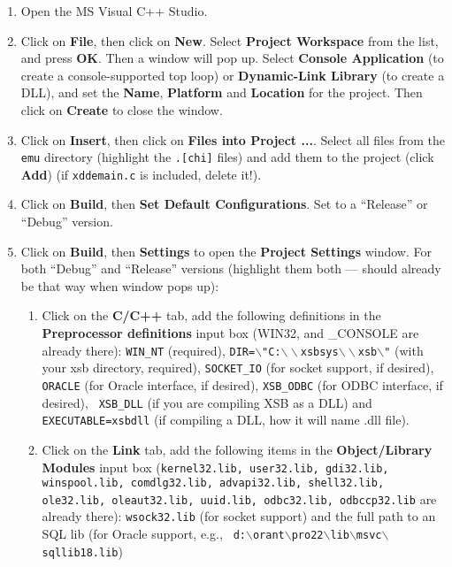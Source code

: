 \begin{enumerate}

\item
   Open the MS Visual C++ Studio.

\item
   Click on {\bf File}, then click on {\bf New}.  Select {\bf Project
   Workspace} from the list, and press {\bf OK}.  Then a window will pop
   up.  Select {\bf Console Application} (to create a console-supported
   top loop) or {\bf Dynamic-Link Library} (to create a DLL), and set
   the {\bf Name}, {\bf Platform} and {\bf Location} for the project.
   Then click on {\bf Create} to close the window.

\item
   Click on {\bf Insert}, then click on {\bf Files into Project ...}.
   Select all files from the {\tt emu} directory (highlight the {\tt*.[chi]}
   files) and add them to the project (click {\bf Add}) (if {\tt xddemain.c}
   is included, delete it!).

\item
   Click on {\bf Build}, then {\bf Set Default Configurations}.  Set to
   a ``Release'' or ``Debug'' version.

\item
   Click on {\bf Build}, then {\bf Settings} to open the {\bf Project
   Settings} window.  For both ``Debug'' and ``Release'' versions
   (highlight them both --- should already be that way when window pops
   up):

	\begin{enumerate}

	\item Click on the {\bf C/C++} tab, add the following
	definitions in the {\bf Preprocessor definitions} input box
	(WIN32, and \_CONSOLE are already there): {\tt WIN\_NT}
	(required), {\tt DIR=$\backslash$"C:$\backslash
	\backslash$xsbsys$\backslash \backslash$xsb$\backslash$"} (with
	your xsb directory, required), {\tt SOCKET\_IO} (for socket
	support, if desired), {\tt ORACLE} (for Oracle interface, if
	desired), {\tt XSB\_ODBC} (for ODBC interface, if desired), {\tt
	XSB\_DLL} (if you are compiling XSB as a DLL) and {\tt
	EXECUTABLE=xsbdll} (if compiling a DLL, how it will name .dll
	file).

	\item Click on the {\bf Link} tab, add the following items in
	the {\bf Object/Library Modules} input box ({\tt kernel32.lib,
	user32.lib, gdi32.lib, winspool.lib, comdlg32.lib, advapi32.lib,
	shell32.lib, ole32.lib, oleaut32.lib, uuid.lib, odbc32.lib,
	odbccp32.lib} are already there): {\tt wsock32.lib} (for socket
	support) and the full path to an SQL lib (for Oracle support,
	e.g., {\tt
	d:$\backslash$orant$\backslash$pro22$\backslash$lib$\backslash$msvc$\backslash$sqllib18.lib})


\end{enumerate}
\end{enumerate}
